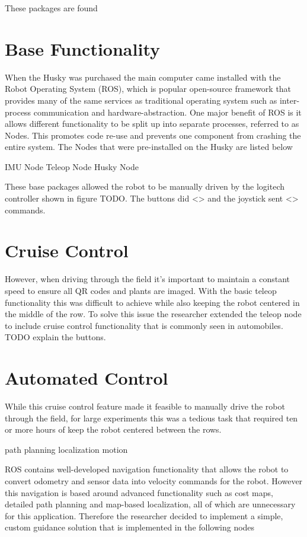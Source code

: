 These packages are found 

\section{Base Functionality}

When the Husky was purchased the main computer came installed with the Robot Operating System (ROS), which is popular open-source framework that provides many of the same services as traditional operating system such as inter-process communication and hardware-abstraction.  One major benefit of ROS is it allows different functionality to be split up into separate processes, referred to as Nodes.  This promotes code re-use and prevents one component from crashing the entire system.   The Nodes that were pre-installed on the Husky are listed below

IMU Node
Teleop Node
Husky Node

These base packages allowed the robot to be manually driven by the logitech controller shown in figure TODO.  The buttons did <> and the joystick sent <> commands.  

\section{Cruise Control}

However, when driving through the field it's important to maintain a constant speed to ensure all QR codes and plants are imaged.  With the basic teleop functionality this was difficult to achieve while also keeping the robot centered in the middle of the row. To solve this issue the researcher extended the teleop node to include cruise control functionality that is commonly seen in automobiles.  TODO explain the buttons.  

\section{Automated Control}

While this cruise control feature made it feasible to manually drive the robot through the field, for large experiments this was a tedious task that required ten or more hours of keep the robot centered between the rows.  

path planning
localization
motion

ROS contains well-developed navigation functionality that allows the robot to convert odometry and sensor data into velocity commands for the robot.  However this navigation is based around advanced functionality such as cost maps, detailed path planning and map-based localization, all of which are unnecessary for this application.  Therefore the researcher decided to implement a simple, custom guidance solution that is implemented in the following nodes

